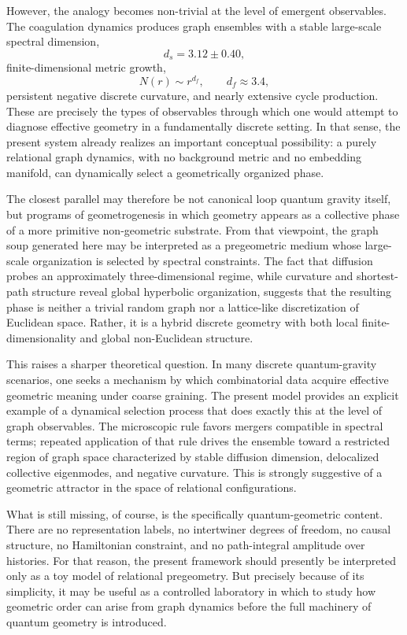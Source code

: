\documentclass[11pt]{article}
\begin{document}
However, the analogy becomes non-trivial at the level of emergent observables.
The coagulation dynamics produces graph ensembles with a stable large-scale spectral dimension,
\[
d_s = 3.12 \pm 0.40,
\]
finite-dimensional metric growth,
\[
N(r)\sim r^{d_f},
\qquad d_f \approx 3.4,
\]
persistent negative discrete curvature, and nearly extensive cycle production.
These are precisely the types of observables through which one would attempt to diagnose effective geometry in a fundamentally discrete setting.
In that sense, the present system already realizes an important conceptual possibility:
a purely relational graph dynamics, with no background metric and no embedding manifold, can dynamically select a geometrically organized phase.

The closest parallel may therefore be not canonical loop quantum gravity itself, but programs of geometrogenesis in which geometry appears as a collective phase of a more primitive non-geometric substrate.
From that viewpoint, the graph soup generated here may be interpreted as a pregeometric medium whose large-scale organization is selected by spectral constraints.
The fact that diffusion probes an approximately three-dimensional regime, while curvature and shortest-path structure reveal global hyperbolic organization, suggests that the resulting phase is neither a trivial random graph nor a lattice-like discretization of Euclidean space.
Rather, it is a hybrid discrete geometry with both local finite-dimensionality and global non-Euclidean structure.

This raises a sharper theoretical question.
In many discrete quantum-gravity scenarios, one seeks a mechanism by which combinatorial data acquire effective geometric meaning under coarse graining.
The present model provides an explicit example of a dynamical selection process that does exactly this at the level of graph observables.
The microscopic rule favors mergers compatible in spectral terms; repeated application of that rule drives the ensemble toward a restricted region of graph space characterized by stable diffusion dimension, delocalized collective eigenmodes, and negative curvature.
This is strongly suggestive of a geometric attractor in the space of relational configurations.

What is still missing, of course, is the specifically quantum-geometric content.
There are no representation labels, no intertwiner degrees of freedom, no causal structure, no Hamiltonian constraint, and no path-integral amplitude over histories.
For that reason, the present framework should presently be interpreted only as a toy model of relational pregeometry.
But precisely because of its simplicity, it may be useful as a controlled laboratory in which to study how geometric order can arise from graph dynamics before the full machinery of quantum geometry is introduced.
\end{document}
